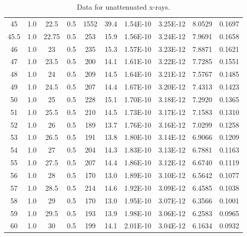 \documentclass[justified]{tufte-book}
\begin{document}
\begin{table}[ht]
\begin{tabular}{cccccccccc}
45          & 1.0   & 22.5       & 0.5           & 1552    & 39.4       & 1.54E-10    & 3.25E-12       & 8.0529    & 0.1697       \\
45.5        & 1.0   & 22.75      & 0.5           & 253     & 15.9       & 1.56E-10    & 3.24E-12       & 7.9691    & 0.1658       \\
46          & 1.0   & 23         & 0.5           & 235     & 15.3       & 1.57E-10    & 3.23E-12       & 7.8871    & 0.1621       \\
47          & 1.0   & 23.5       & 0.5           & 200     & 14.1       & 1.61E-10    & 3.22E-12       & 7.7285    & 0.1551       \\
48          & 1.0   & 24         & 0.5           & 209     & 14.5       & 1.64E-10    & 3.21E-12       & 7.5767    & 0.1485       \\
49          & 1.0   & 24.5       & 0.5           & 207     & 14.4       & 1.67E-10    & 3.20E-12       & 7.4313    & 0.1423       \\
50          & 1.0   & 25         & 0.5           & 228     & 15.1       & 1.70E-10    & 3.18E-12       & 7.2920    & 0.1365       \\
51          & 1.0   & 25.5       & 0.5           & 210     & 14.5       & 1.73E-10    & 3.17E-12       & 7.1583    & 0.1310       \\
52          & 1.0   & 26         & 0.5           & 189     & 13.7       & 1.76E-10    & 3.16E-12       & 7.0299    & 0.1258       \\
53          & 1.0   & 26.5       & 0.5           & 191     & 13.8       & 1.80E-10    & 3.14E-12       & 6.9066    & 0.1209       \\
54          & 1.0   & 27         & 0.5           & 204     & 14.3       & 1.83E-10    & 3.13E-12       & 6.7881    & 0.1163       \\
55          & 1.0   & 27.5       & 0.5           & 207     & 14.4       & 1.86E-10    & 3.12E-12       & 6.6740    & 0.1119       \\
56          & 1.0   & 28         & 0.5           & 170     & 13.0       & 1.89E-10    & 3.10E-12       & 6.5642    & 0.1077       \\
57          & 1.0   & 28.5       & 0.5           & 214     & 14.6       & 1.92E-10    & 3.09E-12       & 6.4585    & 0.1038       \\
58          & 1.0   & 29         & 0.5           & 170     & 13.0       & 1.95E-10    & 3.07E-12       & 6.3566    & 0.1001       \\
59          & 1.0   & 29.5       & 0.5           & 193     & 13.9       & 1.98E-10    & 3.06E-12       & 6.2583    & 0.0965       \\
60          & 1.0   & 30         & 0.5           & 199     & 14.1       & 2.01E-10    & 3.04E-12       & 6.1634    & 0.0932       \\
\end{tabular}
\caption{Data for unattenuated x-rays.}
\label{tab:xrcg1}
\end{table}
\end{document}

